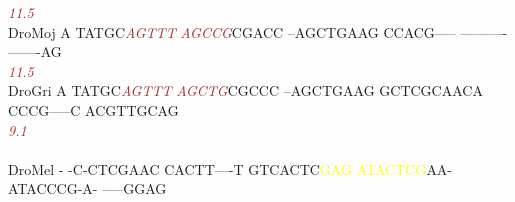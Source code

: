 \documentclass[11pt,twoside,reqno,a4paper]{article}
\begin{document}
{\hspace*{7\charwidth}\hspace*{1\charwidth}\hspace*{6\charwidth}\textit{\textcolor{Brown}{11.5}}\hspace*{1\charwidth}\hspace*{1\charwidth}\hspace*{1\charwidth}\hspace*{1\charwidth}\hspace*{1\charwidth}\\
DroMoj	A	TATGC\textit{\textcolor{Brown}{A}}\textit{\textcolor{Brown}{G}}\textit{\textcolor{Brown}{T}}\textit{\textcolor{Brown}{T}}\textit{\textcolor{Brown}{T}}	\textit{\textcolor{Brown}{A}}\textit{\textcolor{Brown}{G}}\textit{\textcolor{Brown}{C}}\textit{\textcolor{Brown}{C}}\textit{\textcolor{Brown}{G}}CGACC	--AGCTGAAG	CCACG-----	----------	-------AG\\
\hspace*{7\charwidth}\hspace*{1\charwidth}\hspace*{6\charwidth}\textit{\textcolor{Brown}{11.5}}\hspace*{1\charwidth}\hspace*{1\charwidth}\hspace*{1\charwidth}\hspace*{1\charwidth}\hspace*{1\charwidth}\\
DroGri	A	TATGC\textit{\textcolor{Brown}{A}}\textit{\textcolor{Brown}{G}}\textit{\textcolor{Brown}{T}}\textit{\textcolor{Brown}{T}}\textit{\textcolor{Brown}{T}}	\textit{\textcolor{Brown}{A}}\textit{\textcolor{Brown}{G}}\textit{\textcolor{Brown}{C}}\textit{\textcolor{Brown}{T}}\textit{\textcolor{Brown}{G}}CGCCC	--AGCTGAAG	GCTCGCAACA	CCCG-----C	ACGTTGCAG\\
\hspace*{7\charwidth}\hspace*{1\charwidth}\hspace*{6\charwidth}\textit{\textcolor{Brown}{9.1}}\hspace*{1\charwidth}\hspace*{1\charwidth}\hspace*{1\charwidth}\hspace*{1\charwidth}\hspace*{1\charwidth}\\
\\
DroMel	-	-C-CTCGAAC	CACTT----T	GTCACTC\textcolor{Yellow}{G}\textcolor{Yellow}{A}\textcolor{Yellow}{G}	\textcolor{Yellow}{A}\textcolor{Yellow}{T}\textcolor{Yellow}{A}\textcolor{Yellow}{C}\textcolor{Yellow}{T}\textcolor{Yellow}{C}\textcolor{Yellow}{G}AA-	ATACCCG-A-	-----GGAG\\
}
\end{document}
